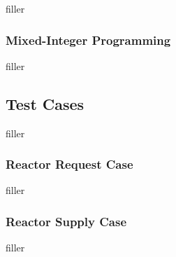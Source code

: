 filler


\subsubsection{Mixed-Integer Programming}

filler


\subsection{Test Cases}

filler

\subsubsection{Reactor Request Case}

filler

\subsubsection{Reactor Supply Case}

filler
